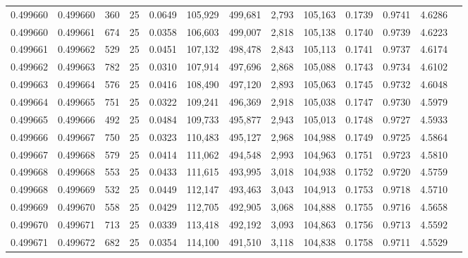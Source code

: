 \begin{tabular}{rrrrrrrrrrrrr}
0.499660 & 0.499660 &   360 &  25 &                                     0.0649 & 105,929 & 499,681 &   2,793 & 105,163 & 0.1739 & 0.9741 & 4.6286 \\
0.499660 & 0.499661 &   674 &  25 &                                     0.0358 & 106,603 & 499,007 &   2,818 & 105,138 & 0.1740 & 0.9739 & 4.6223 \\
0.499661 & 0.499662 &   529 &  25 &                                     0.0451 & 107,132 & 498,478 &   2,843 & 105,113 & 0.1741 & 0.9737 & 4.6174 \\
0.499662 & 0.499663 &   782 &  25 &                                     0.0310 & 107,914 & 497,696 &   2,868 & 105,088 & 0.1743 & 0.9734 & 4.6102 \\
0.499663 & 0.499664 &   576 &  25 &                                     0.0416 & 108,490 & 497,120 &   2,893 & 105,063 & 0.1745 & 0.9732 & 4.6048 \\
0.499664 & 0.499665 &   751 &  25 &                                     0.0322 & 109,241 & 496,369 &   2,918 & 105,038 & 0.1747 & 0.9730 & 4.5979 \\
0.499665 & 0.499666 &   492 &  25 &                                     0.0484 & 109,733 & 495,877 &   2,943 & 105,013 & 0.1748 & 0.9727 & 4.5933 \\
0.499666 & 0.499667 &   750 &  25 &                                     0.0323 & 110,483 & 495,127 &   2,968 & 104,988 & 0.1749 & 0.9725 & 4.5864 \\
0.499667 & 0.499668 &   579 &  25 &                                     0.0414 & 111,062 & 494,548 &   2,993 & 104,963 & 0.1751 & 0.9723 & 4.5810 \\
0.499668 & 0.499668 &   553 &  25 &                                     0.0433 & 111,615 & 493,995 &   3,018 & 104,938 & 0.1752 & 0.9720 & 4.5759 \\
0.499668 & 0.499669 &   532 &  25 &                                     0.0449 & 112,147 & 493,463 &   3,043 & 104,913 & 0.1753 & 0.9718 & 4.5710 \\
0.499669 & 0.499670 &   558 &  25 &                                     0.0429 & 112,705 & 492,905 &   3,068 & 104,888 & 0.1755 & 0.9716 & 4.5658 \\
0.499670 & 0.499671 &   713 &  25 &                                     0.0339 & 113,418 & 492,192 &   3,093 & 104,863 & 0.1756 & 0.9713 & 4.5592 \\
0.499671 & 0.499672 &   682 &  25 &                                     0.0354 & 114,100 & 491,510 &   3,118 & 104,838 & 0.1758 & 0.9711 & 4.5529 \\

\end{tabular}
